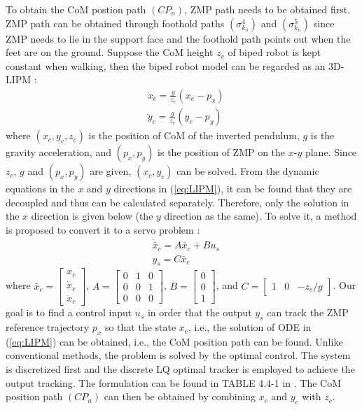 \documentclass{ieeeaccess}
\begin{document}
To obtain the CoM postion path $(CP_n)$, ZMP path needs to be obtained first. ZMP path can be obtained through foothold paths $(\sigma^{4}_{k_n})$ and $(\sigma^{5}_{k_n})$ since ZMP needs to lie in the support face and the foothold path points out when the feet are on the ground. Suppose the CoM height $z_c$ of biped robot is kept constant when walking, then the biped robot model can be regarded as an 3D-LIPM \cite{kajita2001real}:
\begin{equation} \label{eq:LIPM}
    \begin{split}
        & \ddot{x}_c = \frac{g}{z_c}(x_c - p_x) \\
        & \ddot{y}_c = \frac{g}{z_c}(y_c - p_y)
    \end{split}
\end{equation}
where $(x_c, y_c, z_c)$ is the position of CoM of the inverted pendulum, $g$ is the gravity acceleration, and $(p_x,p_y)$ is the position of ZMP on the $x$-$y$ plane. Since $z_c$, $g$ and $(p_x,p_y)$ are given, $(x_c, y_c)$ can be solved. From the dynamic equations in the $x$ and $y$ directions in (\ref{eq:LIPM}), it can be found that they are decoupled and thus can be calculated separately. Therefore, only the solution in the $x$ direction is given below (the $y$ direction as the same). To solve it, a method is proposed to convert it to a servo problem \cite{1241826}:
\begin{equation} \label{eq:output tracking}
    \begin{split}
        & \dot{\bar{x}}_c = A\bar{x}_c + Bu_s \\
        & y_s = C\bar{x}_c
    \end{split}
\end{equation}
where $\bar{x}_c = \begin{bmatrix}
    x_c \\ \dot{x}_c \\ \ddot{x}_c
\end{bmatrix}$, $A = \begin{bmatrix}
    0 & 1 & 0 \\ 0 & 0 & 1 \\ 0 & 0 & 0
\end{bmatrix}$, $B = \begin{bmatrix}
    0 \\ 0 \\ 1
\end{bmatrix}$, and $C = \begin{bmatrix}
    1 & 0 & -z_c/g
\end{bmatrix}$. Our goal is to find a control input $u_s$ in order that the output $y_s$ can track the ZMP reference trajectory $p_x$ so that the state $x_c$, i.e., the solution of ODE in (\ref{eq:LIPM}) can be obtained, i.e., the CoM position path can be found. Unlike conventional methods, the problem is solved by the optimal control. The system is discretized first and the discrete LQ optimal tracker is employed to achieve the output tracking. The formulation can be found in TABLE 4.4-1 in \cite{lewis2012optimal}. The CoM position path $(CP_n)$ can then be obtained by combining $x_c$ and $y_c$ with $z_c$.
\end{document}
